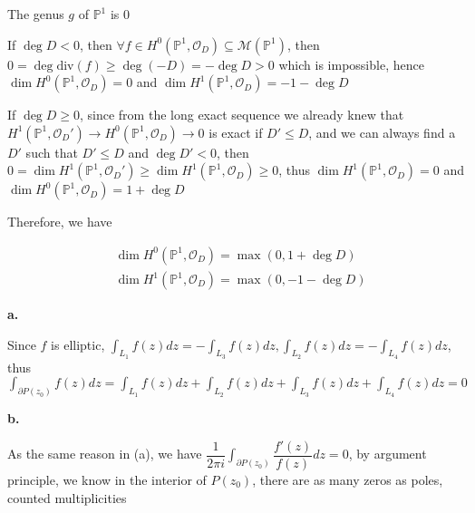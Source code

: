 \documentclass[../main.tex]{subfiles}
\begin{document}
\begin{problem}
The genus $g$ of $\mathbb{P}^1$ is $0$ \par
If $\deg D<0$, then $\forall f\in H^0(\mathbb{P}^1,\mathcal{O}_D)\subseteq\mathcal{M}(\mathbb{P}^1)$, then $0=\deg\mathrm{div}(f)\geq \deg(-D)=-\deg D>0$ which is impossible, hence $\dim H^0(\mathbb{P}^1,\mathcal{O}_D)=0$ and $\dim H^1(\mathbb{P}^1,\mathcal{O}_D)=-1-\deg D$ \par
If $\deg D\geq 0$, since from the long exact sequence we already knew that $H^1(\mathbb{P}^1,\mathcal{O}_D')\rightarrow H^0(\mathbb{P}^1,\mathcal{O}_D)\rightarrow 0$ is exact if $D'\leq D$, and we can always find a $D'$ such that $D'\leq D$ and $\deg D'<0$, then $0=\dim H^1(\mathbb{P}^1,\mathcal{O}_D')\geq \dim H^1(\mathbb{P}^1,\mathcal{O}_D)\geq 0$, thus $\dim H^1(\mathbb{P}^1,\mathcal{O}_D)=0$ and $\dim H^0(\mathbb{P}^1,\mathcal{O}_D)=1+\deg D$ \par
Therefore, we have \par
\[
\begin{aligned}
&\dim H^0(\mathbb{P}^1,\mathcal{O}_D)=\max\left(0,1+\deg D\right) \\
&\dim H^1(\mathbb{P}^1,\mathcal{O}_D)=\max\left(0,-1-\deg D\right)
\end{aligned}
\]
\end{problem}

\begin{problem}
\begin{center}
\end{center}
\textbf{a.} \par
Since $f$ is elliptic, $\displaystyle\int_{L_1}f(z)dz=-\int_{L_3}f(z)dz,\int_{L_2}f(z)dz=-\int_{L_4}f(z)dz$, thus $\displaystyle\int_{\partial P(z_0)}f(z)dz=\int_{L_1}f(z)dz+\int_{L_2}f(z)dz+\int_{L_3}f(z)dz+\int_{L_4}f(z)dz=0$ \par
\textbf{b.} \par
As the same reason in (a), we have $\displaystyle\dfrac{1}{2\pi i}\int_{\partial P(z_0)}\dfrac{f'(z)}{f(z)}dz=0$, by argument principle, we know in the interior of $P(z_0)$, there are as many zeros as poles, counted multiplicities \par
\end{problem}
\end{document}
